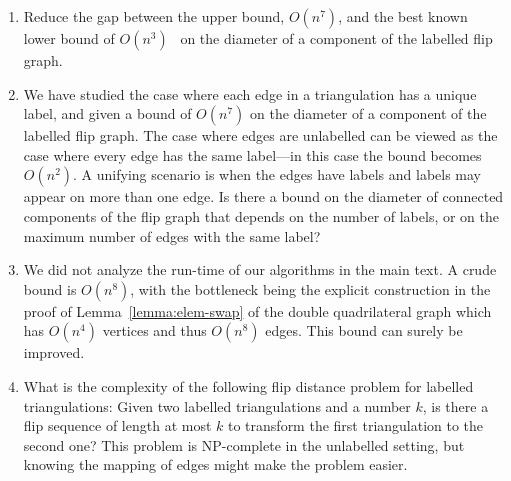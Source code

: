 \begin{enumerate}

\item 
Reduce the gap between the upper bound, $O(n^7)$, and the best known lower bound of $O(n^3)$~\cite{bose2013flipping} on the diameter of a component of the labelled flip graph.

\item 
We have studied the case where each edge in a triangulation has a unique label, and given a bound of $O(n^7)$ on the diameter of a component of the labelled flip graph.  The case where edges are unlabelled can be viewed as the case where every edge has the same label---in this case the bound becomes $O(n^2)$.  
A unifying scenario is when the edges have labels and labels may appear on more than one edge.
Is there a bound on the diameter of connected components of the flip graph that depends on the number of labels, or on the maximum number of edges with the same label?
%

\item
We did not analyze the run-time of our algorithms in the main text.  A crude bound is $O(n^8)$, with the bottleneck being the explicit construction in the proof of Lemma~\ref{lemma:elem-swap} of the double quadrilateral graph which has $O(n^4)$ vertices and thus $O(n^8)$ edges.  This bound can surely be improved. 

 \item 
 What is the complexity of the following flip distance problem for labelled triangulations: Given two labelled triangulations and a number $k$, is there a flip sequence of length at most $k$ to transform the first triangulation to the second one?
This problem is NP-complete in the unlabelled setting, but 
knowing the mapping of edges might make the problem easier.

\end{enumerate}  

   
